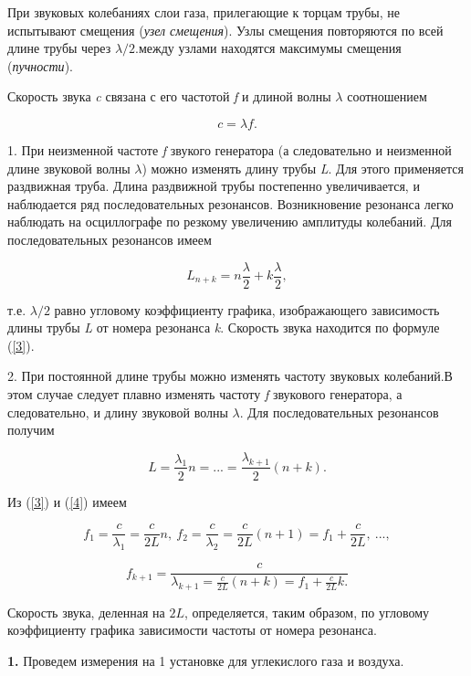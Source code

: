 \documentclass[12pt,a4paper]{article}
\begin{document}
При звуковых колебаниях слои газа, прилегающие к торцам трубы, не испытывают смещения (\textit{узел смещения}). Узлы смещения повторяются по всей длине трубы через $\lambda / 2$.между узлами находятся максимумы смещения (\textit{пучности}).

Скорость звука \textit{c} связана с его частотой \textit{f} и длиной волны $\lambda$ соотношением

\begin{equation}\label{3}
c = \lambda f.
\end{equation}

1. При неизменной частоте \textit{f} звукого генератора (а следовательно и неизменной длине звуковой волны $\lambda$) можно изменять длину трубы \textit{L}. Для этого применяется раздвижная труба. Длина раздвижной трубы постепенно увеличивается, и наблюдается ряд последовательных резонансов. Возникновение резонанса легко наблюдать на осциллографе по резкому увеличению амплитуды колебаний. Для последовательных резонансов имеем

\[L_{n+k} = n\frac{\lambda}{2} + k\frac{\lambda}{2},\]

т.е. $\lambda / 2$ равно угловому коэффициенту графика, изображающего зависимость длины трубы \textit{L} от номера резонанса \textit{k}. Скорость звука находится по формуле (\ref{3}).

2. При постоянной длине трубы можно изменять частоту звуковых колебаний.В этом случае следует плавно изменять частоту \textit{f} звукового генератора, а следовательно, и длину звуковой волны $\lambda$. Для последовательных резонансов получим

\begin{equation}\label{4}
L = \frac{\lambda_1}{2}n = ... = \frac{\lambda_{k+1}}{2}(n + k).
\end{equation}

Из (\ref{3}) и (\ref{4}) имеем

\[f_1 = \frac{c}{\lambda_1} = \frac{c}{2L}n, \: f_2 = \frac{c}{\lambda_2} = \frac{c}{2L}(n + 1) = f_1 + \frac{c}{2L}, \: ...,\]

\begin{equation}\label{5}
f_{k+1} = \frac{c}{\lambda_{k+1} = \frac{c}{2L} (n+k) = f_1 + \frac{c}{2L}k.}
\end{equation}

Скорость звука, деленная на $2L$, определяется, таким образом, по угловому коэффициенту графика зависимости частоты от номера резонанса.

\textbf{1.} Проведем измерения на 1 установке для углекислого газа и воздуха.
\end{document}
